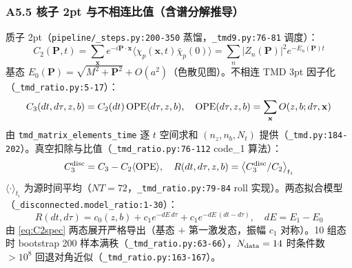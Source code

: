 \documentclass[UTF8]{ctexart}
\begin{document}
\subsubsection{A5.5 核子 2pt 与不相连比值（含谱分解推导）}
质子 2pt（\texttt{\nolinkurl{pipeline/\_steps.py:200-350}} 蒸馏，\texttt{\nolinkurl{\_tmd9.py:76-81}} 调度）：
\begin{equation}
C_2(\mathbf{P},t)=\sum_{\mathbf{x}}e^{-i\mathbf{P}\cdot\mathbf{x}}\langle\chi_p(\mathbf{x},t)\bar\chi_p(0)\rangle = \sum_n |Z_n(\mathbf{P})|^2 e^{-E_n(\mathbf{P})t}
\label{eq:C2spec}
\end{equation}
基态 $E_0(\mathbf{P})=\sqrt{M^2+\mathbf{P}^2}+O(a^2)$（色散见图）。不相连 TMD 3pt 因子化（\texttt{\nolinkurl{\_tmd\_ratio.py:5-17}}）：
\begin{equation}
C_3(dt,d\tau,z,b)=C_2(dt)\,{\rm OPE}(d\tau,z,b),\quad {\rm OPE}(d\tau,z,b)=\sum_{\mathbf{x}}O(z,b;d\tau,\mathbf{x})
\label{eq:C3fact}
\end{equation}
由 \texttt{\nolinkurl{tmd\_matrix\_elements\_time}} 逐 $t$ 空间求和 $(n_z,n_b,N_t)$ 提供（\texttt{\nolinkurl{\_tmd.py:184-202}}）。真空扣除与比值（\texttt{\nolinkurl{\_tmd\_ratio.py:76-112}} code\_1 算法）：
\begin{equation}
C_3^{\rm disc}=C_3-C_2\langle{\rm OPE}\rangle,\quad R(dt,d\tau,z,b)=\big\langle C_3^{\rm disc}/C_2\big\rangle_{t_i}
\label{eq:ratio}
\end{equation}
$\langle\cdot\rangle_{t_i}$ 为源时间平均（$NT=72$，\texttt{\nolinkurl{\_tmd\_ratio.py:79-84}} roll 实现）。两态拟合模型（\texttt{\nolinkurl{\_disconnected.model\_ratio:1-30}}）：
\begin{equation}
R(dt,d\tau)=c_0(z,b)+c_1 e^{-dE\,d\tau}+c_1 e^{-dE\,(dt-d\tau)},\quad dE=E_1-E_0
\label{eq:ratioModel}
\end{equation}
由 \eqref{eq:C2spec} 两态展开严格导出（基态 $+$ 第一激发态，振幅 $c_1$ 对称）。10 组态时 bootstrap 200 样本满秩（\texttt{\nolinkurl{\_tmd\_ratio.py:63-66}}），$N_{\rm data}=14$ 时条件数 $>10^8$ 回退对角近似（\texttt{\nolinkurl{\_tmd\_ratio.py:163-167}}）。
\end{document}
